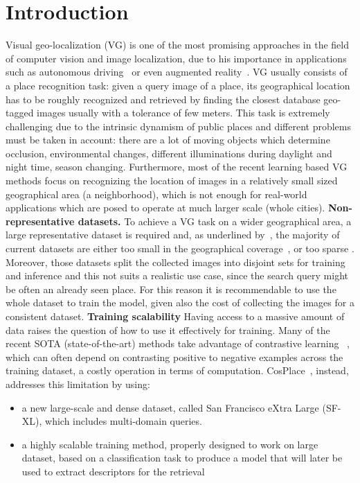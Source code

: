 \documentclass[10pt,twocolumn,letterpaper]{article}
\begin{document}
\section{Introduction}\label{sec:introduction}
Visual geo-localization (VG) is one of the most promising approaches in the field of computer vision and image localization,
due to his importance in applications such as autonomous driving~\cite{6906961} or even augmented reality~\cite{middelberg}.
VG usually consists of a place recognition task: given a query image of a place, its geographical location has to be roughly recognized and retrieved
by finding the closest database geo-tagged images usually with a tolerance of few meters. 
This task is extremely challenging due to the intrinsic dynamism of public places and different problems must be taken in account:
there are a lot of moving objects which determine occlusion, environmental changes, different illuminations during daylight and night time, season changing.
Furthermore, most of the recent learning based VG methods focus on recognizing the location of images in a relatively small sized geographical area (\eg a neighborhood), 
which is not enough for real-world applications which are posed to operate at much larger scale (\eg whole cities).
\newline
\textbf{Non-representative datasets.}
To achieve a VG task on a wider geographical area, a large representative dataset is required and, as underlined by~\cite{Berton_CVPR_2022_CosPlace}, the majority of 
current datasets are either too small in the geographical coverage~\cite{netvlad,lidards,kittids}, or too sparse \cite{oxfds, mapillary}. Moreover, those datasets split the collected images into 
disjoint sets for training and inference and this not suits a realistic use case, since the search query might be often an already seen place.
For this reason it is recommendable to use the whole dataset to train the model, given also the cost of collecting the images for a consistent dataset.
\newline
\textbf{Training scalability}
Having access to a massive amount of data raises the question of how to use it effectively for training. Many of the recent SOTA (state-of-the-art) methods take advantage
of contrastive learning ~\cite{netvlad, adageo}, which can often depend on contrasting positive to negative examples across the training dataset, a costly operation in terms of computation. CosPlace~\cite{Berton_CVPR_2022_CosPlace}, instead, addresses this limitation by using:
\begin{itemize}
    \item a new large-scale and dense dataset, called San Francisco eXtra Large (SF-XL), which includes multi-domain queries.
    \item a highly scalable training method, properly designed to work on large dataset, based on a classification task to produce a model that will later be used to extract descriptors for the retrieval
\end{itemize}
\end{document}
